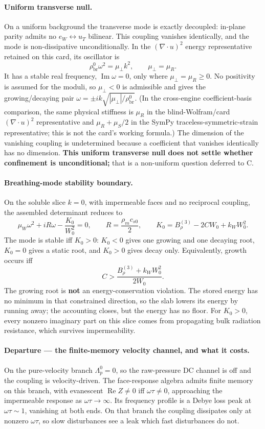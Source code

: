 \paragraph{Uniform transverse null.}
On a uniform background the transverse mode is exactly decoupled: in-plane
parity admits no \(e_W\leftrightarrow u_T\) bilinear. This coupling vanishes
identically, and the mode is non-dissipative unconditionally. In the
\((\nabla\!\cdot u)^2\) energy representative retained on this card, its
oscillator is
\[
  \rho_{\mathrm{br}}^0\omega^2=\mu_\perp k^2,
  \qquad \mu_\perp=\mu_R.
\]
It has a stable real frequency, \(\operatorname{Im}\omega=0\), only where
\(\mu_\perp=\mu_R\geq0\). No positivity is assumed for the moduli, so
\(\mu_\perp<0\) is admissible and gives the growing/decaying pair
\(\omega=\pm i k\sqrt{|\mu_\perp|/\rho_{\mathrm{br}}^0}\). (In the
cross-engine coefficient-basis comparison, the same physical stiffness is
\(\mu_R\) in the blind-Wolfram/card \((\nabla\!\cdot u)^2\) representative
and \(\mu_R+\mu_S/2\) in the SymPy traceless-symmetric-strain representative;
this is not the card's working formula.)
The dimension of the vanishing coupling is undetermined because a coefficient
that vanishes identically has no dimension. \textbf{This uniform transverse
null does not settle whether confinement is unconditional;} that is a
non-uniform question deferred to C.

\paragraph{Breathing-mode stability boundary.}
On the soluble slice \(k=0\), with impermeable faces and no reciprocal
coupling, the assembled determinant reduces to
\[
  \mu_W\omega^2+iR\omega-\frac{K_0}{W_0^2}=0,
  \qquad
  R=\frac{\rho_m c_{s0}}{2},
  \qquad
  K_0=B_\rho^{(3)}-2CW_0+k_WW_0^2.
\]
The mode is stable iff \(K_0>0\): \(K_0<0\) gives one growing and one decaying
root, \(K_0=0\) gives a static root, and \(K_0>0\) gives decay only.
Equivalently, growth occurs iff
\[
  C>\frac{B_\rho^{(3)}+k_WW_0^2}{2W_0}.
\]
The growing root is \textbf{not} an energy-conservation violation. The stored
energy has no minimum in that constrained direction, so the slab lowers its
energy by running away; the accounting closes, but the energy has no floor.
For \(K_0>0\), every nonzero imaginary part on this slice comes from
propagating bulk radiation resistance, which survives impermeability.

\paragraph{Departure --- the finite-memory velocity channel, and what it costs.}
On the pure-velocity branch \(\Lambda_p^0=0\), so the raw-pressure DC channel
is off and the coupling is velocity-driven. The face-response algebra admits
finite memory on this branch, with evanescent \(\operatorname{Re}Z\neq0\) iff
\(\omega\tau\neq0\), approaching the impermeable response as
\(\omega\tau\to\infty\). Its frequency profile is a Debye loss peak at
\(\omega\tau\sim1\), vanishing at both ends. On that branch the coupling
dissipates only at nonzero \(\omega\tau\), so slow disturbances see a leak
which fast disturbances do not.

